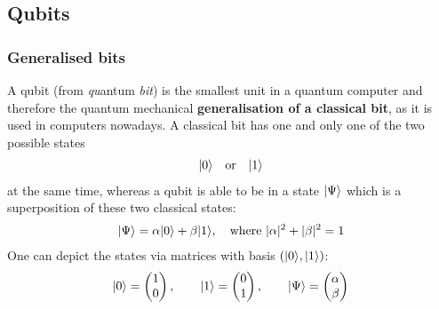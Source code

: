 \documentclass[bibliography=totocnumbered]{article}
\theoremstyle{NoticeStyle}
\begin{document}
\subsection{Qubits}\label{sec:Qubits}

\subsubsection{Generalised bits}
A qubit (from \textit{qu}antum \textit{bit}) is the smallest unit in a quantum computer and therefore the quantum mechanical \textbf{generalisation of a classical bit}, as it is used in computers nowadays. A classical bit has one and only one of the two possible states
%
\begin{align}
	{\left\vert{0}\right\rangle} \quad \text{or} \quad {\left\vert{1}\right\rangle}
\end{align}
%
at the same time, whereas a qubit is able to be in a state ${\left\vert{\Psi}\right\rangle}$ which is a superposition of these two classical states:
%
\begin{align}
	{\left\vert{\Psi}\right\rangle} = \alpha {\left\vert{0}\right\rangle} + \beta {\left\vert{1}\right\rangle}, \quad \text{where }|\alpha|^2 + |\beta|^2 = 1	\label{eq:Superpos of qubit}
\end{align}
%
%
One can depict the states via matrices with basis $({\left\vert{0}\right\rangle}, {\left\vert{1}\right\rangle})$:
\begin{align}
	{\left\vert{0}\right\rangle} = \begin{pmatrix}1\\0 \end{pmatrix}, \quad\quad {\left\vert{1}\right\rangle} = \begin{pmatrix}0\\1 \end{pmatrix}, \quad\quad {\left\vert{\Psi}\right\rangle} = \begin{pmatrix}\alpha\\\beta \end{pmatrix}
\end{align}
\end{document}
